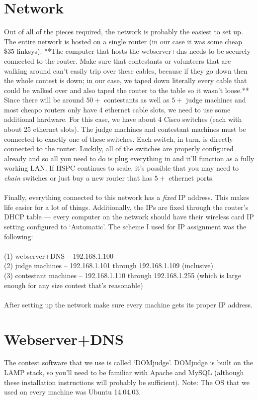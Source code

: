 \documentclass[a4paper,11pt]{article}
\begin{document}
\section{Network}
Out of all of the pieces required, the network is probably the easiest to set up. The entire network is hosted on a single router (in our case it was some cheap \$35 linksys). **The computer that hosts the webserver+dns needs to be securely connected to the router. Make sure that contestants or volunteers that are walking around can't easily trip over these cables, because if they go down then the whole contest is down; in our case, we taped down literally every cable that could be walked over and also taped the router to the table so it wasn't loose.** Since there will be around $50+$ contestants as well as $5+$ judge machines and most cheapo routers only have 4 ethernet cable slots, we need to use some additional hardware. For this case, we have about 4 Cisco switches (each with about 25 ethernet slots). The judge machines and contestant machines must be connected to exactly one of these switches. Each switch, in turn, is directly connected to the router. Luckily, all of the switches are properly configured already and so all you need to do is plug everything in and it'll function as a fully working LAN. If HSPC continues to scale, it's possible that you may need to \emph{chain} switches or just buy a new router that has $5+$ ethernet ports.\\\\
Finally, everything connected to this network has a \emph{fixed} IP address. This makes life easier for a lot of things. Additionally, the IPs are fixed through the router's DHCP table --- every computer on the network should have their wireless card IP setting configured to `Automatic'. The scheme I used for IP assignment was the following:\\\\
(1) webserver+DNS -- 192.168.1.100 \\
(2) judge machines -- 192.168.1.101 through 192.168.1.109 (inclusive) \\
(3) contestant machines -- 192.168.1.110 through 192.168.1.255 (which is large enough for any size contest that's reasonable) \\\\
After setting up the network make sure every machine gets its proper IP address.

\section{Webserver+DNS}
The contest software that we use is called `DOMjudge'. DOMjudge is built on the LAMP stack, so you'll need to be familiar with Apache and MySQL (although these installation instructions will probably be sufficient). Note: The OS that we used on every machine was Ubuntu 14.04.03.
\end{document}

